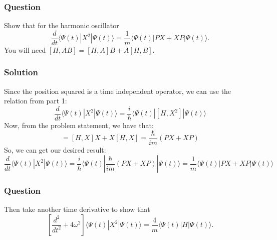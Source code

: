 \documentclass[12pt]{article}
\begin{document}
\subsubsection{Question}
Show that for the harmonic oscillator
\[
\frac{d}{dt} \langle \Psi(t)|X^2|\Psi(t)\rangle = \frac{1}{m} \langle \Psi(t)|PX + XP|\Psi(t)\rangle.
\]
You will need $[H, AB] = [H, A]B + A[H, B]$.
\subsubsection{Solution}
Since the position squared is a time independent operator, we can use the relation from part 1:
\begin{equation}
    \frac{d}{dt} \langle \Psi(t)|X^2|\Psi(t)\rangle = \frac{i}{\hbar} \langle \Psi(t)|[H, X^2]|\Psi(t)\rangle
\end{equation}
Now, from the problem statement, we have that:
\begin{equation}
    [H, X^2] = [H, X]X + X[H, X] = \frac{\hbar}{im}\left(P X + XP\right)
\end{equation}
So, we can get our desired result:
\begin{equation}
    \frac{d}{dt} \langle \Psi(t)|X^2|\Psi(t)\rangle = \frac{i}{\hbar} \langle \Psi(t)| \frac{\hbar}{im}\left(P X + XP\right) |\Psi(t)\rangle = \boxed{\frac{1}{m} \langle \Psi(t)|PX + XP|\Psi(t)\rangle}
\end{equation}
\subsubsection{Question}
Then take another time derivative to show that
\[
\left[ \frac{d^2}{dt^2} + 4\omega^2 \right]\langle \Psi(t)|X^2|\Psi(t)\rangle = \frac{4}{m} \langle \Psi(t)|H|\Psi(t)\rangle.
\]
\end{document}
